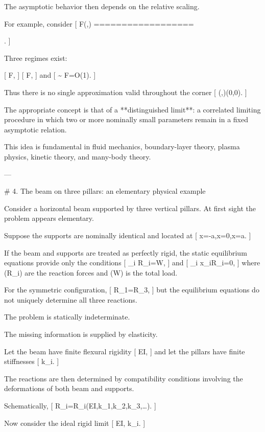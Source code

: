 The asymptotic behavior then depends on the relative scaling.

For example, consider
[
F(\epsilon,\delta)
==================

\frac{\epsilon}{\epsilon+\delta}.
]

Three regimes exist:

[
\delta\ll\epsilon
\quad\Longrightarrow\quad
F,
]
[
\epsilon\ll\delta
\quad\Longrightarrow\quad
F,
]
and
[
\delta\sim\epsilon
\quad\Longrightarrow\quad
F=O(1).
]

Thus there is no single approximation valid throughout the corner
[
(\epsilon,\delta)\rightarrow(0,0).
]

The appropriate concept is that of a **distinguished limit**: a correlated limiting procedure in which two or more nominally small parameters remain in a fixed asymptotic relation.

This idea is fundamental in fluid mechanics, boundary-layer theory, plasma physics, kinetic theory, and many-body theory.

---

# 4. The beam on three pillars: an elementary physical example

Consider a horizontal beam supported by three vertical pillars. At first sight the problem appears elementary.

Suppose the supports are nominally identical and located at
[
x=-a,\qquad x=0,\qquad x=a.
]

If the beam and supports are treated as perfectly rigid, the static equilibrium equations provide only the conditions
[
\sum_i R_i=W,
]
and
[
\sum_i x_iR_i=0,
]
where (R_i) are the reaction forces and (W) is the total load.

For the symmetric configuration,
[
R_1=R_3,
]
but the equilibrium equations do not uniquely determine all three reactions.

The problem is statically indeterminate.

The missing information is supplied by elasticity.

Let the beam have finite flexural rigidity
[
EI,
]
and let the pillars have finite stiffnesses
[
k_i.
]

The reactions are then determined by compatibility conditions involving the deformations of both beam and supports.

Schematically,
[
R_i=R_i(EI,k_1,k_2,k_3,\ldots).
]

Now consider the ideal rigid limit
[
EI\rightarrow\infty,
\qquad
k_i\rightarrow\infty.
]

